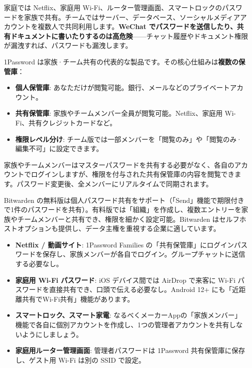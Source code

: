 
家庭では Netflix、家庭用 Wi-Fi、ルーター管理画面、スマートロックのパスワードを家族で共有。チームではサーバー、データベース、ソーシャルメディアアカウントを複数人で共同利用します。\textbf{WeChat でパスワードを送信したり、共有ドキュメントに書いたりするのは高危険}——チャット履歴やドキュメント権限が漏洩すれば、パスワードも漏洩します。


1Password は家族·チーム共有の代表的な製品です。その核心仕組みは\textbf{複数の保管庫}：

\begin{itemize}
  \item \textbf{個人保管庫}: あなただけが閲覧可能。銀行、メールなどのプライベートアカウント。
  \item \textbf{共有保管庫}: 家族やチームメンバー全員が閲覧可能。Netflix、家庭用 Wi-Fi、共有クレジットカードなど。
  \item \textbf{権限レベル分け}: チーム版では一部メンバーを「閲覧のみ」や「閲覧のみ·編集不可」に設定できます。
\end{itemize}

家族やチームメンバーはマスターパスワードを共有する必要がなく、各自のアカウントでログインしますが、権限を付与された共有保管庫の内容を閲覧できます。パスワード変更後、全メンバーにリアルタイムで同期されます。


Bitwarden の無料版は個人パスワード共有をサポート（「Send」機能で期限付きで1件のパスワードを共有）。有料版では「組織」を作成し、複数エントリーを家族やチームメンバーと共有でき、権限を細かく設定可能。Bitwarden はセルフホストオプションも提供し、データ主権を重視する企業に適しています。


\begin{itemize}
  \item \textbf{Netflix / 動画サイト}: 1Password Families の「共有保管庫」にログインパスワードを保存し、家族メンバーが各自でログイン。グループチャットに送信する必要なし。
  \item \textbf{家庭用 Wi-Fi パスワード}: iOS デバイス間では AirDrop で来客に Wi-Fi パスワードを直接共有でき、口頭で伝える必要なし。Android 12+ にも「近距離共有でWi-Fi共有」機能があります。
  \item \textbf{スマートロック、スマート家電}: なるべくメーカーAppの「家族メンバー」機能で各自に個別アカウントを作成し、1つの管理者アカウントを共有しないようにしましょう。
  \item \textbf{家庭用ルーター管理画面}: 管理者パスワードは 1Password 共有保管庫に保存し、ゲスト用 Wi-Fi は別の SSID で設定。
\end{itemize}

